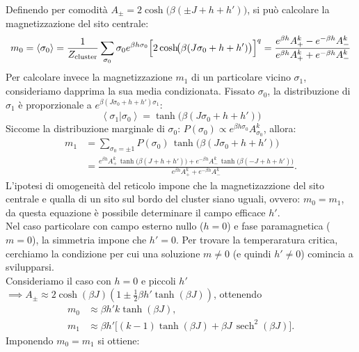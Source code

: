 Definendo per comodità $A_{\pm}=2\cosh\bigl(\beta(\pm J+h+h')\bigr)$, si può calcolare la magnetizzazione del sito centrale:
\begin{equation}
m_{0} =\left\langle \sigma_0\right\rangle  =\frac{1}{Z_{\text{cluster}}}
        \sum_{\sigma_{0}} \sigma_{0} e^{\beta h \sigma_{0}}
        \Bigl[ 2\cosh\!\bigl(\beta(J\sigma_{0}+h+h')\bigr) \Bigr]^{q}=\frac{e^{\beta h} A^k_+ - e^{-\beta h}A^k_{-}}{e^{\beta h} A^k_+ + e^{-\beta h}A^k_{-}}
\end{equation}
Per calcolare invece la magnetizzazione $m_1$ di un particolare vicino $\sigma_1$, consideriamo dapprima la sua media condizionata. Fissato $\sigma_0$, la distribuzione di $\sigma_1$ è proporzionale a $e^{\beta (J\sigma_0 + h + h')\sigma_1}$:
\begin{equation}
    \left\langle \sigma_1 | \sigma_0\right\rangle= \tanh \bigl(\beta(J\sigma_0+h+h')\bigr)
\end{equation}
Siccome la distribuzione marginale di $\sigma_0$: $P(\sigma_0) \propto e^{\beta h \sigma_0} A_{\sigma_0}^k$, allora:
\begin{align}
m_{1} &= \sum_{\sigma_{0}=\pm1} P(\sigma_{0})\,
        \tanh\!\bigl(\beta(J\sigma_{0}+h+h')\bigr) \\
      &= \frac{ 
          e^{\beta h} A_{+}^{k}\, \tanh\!\bigl(\beta(J+h+h')\bigr)
          + e^{-\beta h} A_{-}^{k}\, \tanh\!\bigl(\beta(-J+h+h')\bigr)
        }{
          e^{\beta h} A_{+}^{k} + e^{-\beta h} A_{-}^{k}
        }.
\end{align}
L'ipotesi di omogeneità del reticolo impone che la magnetizazzione del sito centrale e qualla di un sito sul bordo del cluster siano uguali, ovvero: $m_0=m_1$, da questa equazione è possibile determinare il campo efficace $h'$.\\
Nel caso particolare con campo esterno nullo ($h=0$) e fase paramagnetica ($m=0$), la simmetria impone che $h'=0$. Per trovare la temperaratura critica, cerchiamo la condizione per cui una soluzione $m \not =0$ (e quindi $h' \not =0$) comincia a svilupparsi.\\
Consideriamo il caso con $h=0$ e piccoli $h'$ $\implies A_{\pm} \approx 2 \cosh (\beta J)(1 \pm \frac{1}{2}\beta h' \tanh(\beta J))$, ottenendo
\begin{align}
m_{0} &\approx \beta h' k \tanh(\beta J), \\
m_{1} &\approx \beta h' \bigl[ (k-1)\tanh(\beta J) + \beta J\,\operatorname{sech}^{2}(\beta J) \bigr].
\end{align}
Imponendo $m_0=m_1$ si ottiene:
